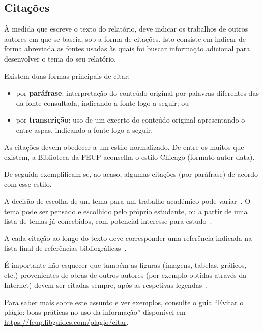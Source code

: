 
\subsection*{Citações}

À medida que escreve o texto do relatório, deve indicar os trabalhos
de outros autores em que se baseia, sob a forma de citações.
Isto consiste em indicar de forma abreviada as fontes usadas às quais
foi buscar informação adicional para desenvolver o tema do seu
relatório.

Existem duas formas principais de citar:
\begin{itemize}
\item por \textbf{paráfrase}: interpretação do conteúdo original por
  palavras diferentes das da fonte consultada, indicando a fonte logo
  a seguir; ou 
\item 
  por \textbf{transcrição}: uso de um excerto do conteúdo original
  apresentando-o entre aspas, indicando a fonte logo a seguir.
\end{itemize}

As citações devem obedecer a um estilo normalizado.
De entre os muitos que existem, a Biblioteca da FEUP aconselha o
estilo Chicago (formato autor-data).

\begin{info}
De seguida exemplificam-se, ao acaso, algumas citações (por paráfrase)
de acordo com esse estilo.
\end{info}

A decisão de escolha de um tema para um trabalho académico pode
variar~\parencite{kn:Bel02-book}.
O tema pode ser pensado e escolhido pelo próprio estudante, ou a
partir de uma lista de temas já concebidos, com potencial interesse
para estudo~\parencite{kn:GLPR14-joPhysics}.

A cada citação ao longo do texto deve corresponder uma referência
indicada na lista final de referências
bibliográficas~\parencite{kn:Lip08,kn:MSS+12-wemep,kn:VKL+18-dtu}. 

É importante não esquecer que também as figuras (imagens, tabelas,
gráficos, etc.) provenientes de obras de outros autores (por exemplo 
obtidas através da Internet) devem ser citadas sempre, após as
respetivas legendas~\parencite{kn:GLPC22-torque}.

Para saber mais sobre este assunto e ver exemplos, consulte o guia
``Evitar o plágio: boas práticas no uso da informação'' disponível 
em \url{https://feup.libguides.com/plagio/citar}.  

